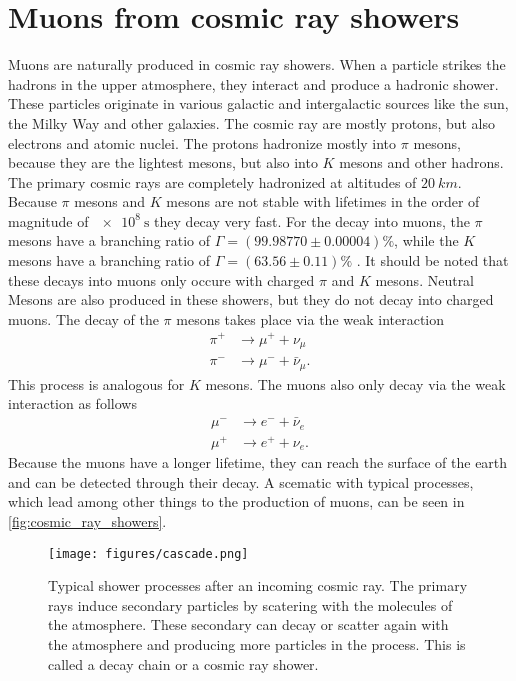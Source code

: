 \section{Muons from cosmic ray showers} 
Muons are naturally produced in cosmic ray showers. When a particle strikes the 
hadrons in the upper atmosphere, they interact and produce a hadronic shower. These particles originate 
in various galactic and intergalactic sources like the sun, the Milky Way and other galaxies. The cosmic 
ray are mostly protons, but also electrons and atomic nuclei. The protons 
hadronize mostly into $\pi$ mesons, because they are the lightest mesons, but also into $K$ mesons 
and other hadrons.
The primary cosmic rays are completely hadronized at altitudes of $\SI{20}{km}$. Because $\pi$ mesons and $K$ mesons are not stable with lifetimes in the order of 
magnitude of $\SI{e8}{\second}$ they decay very fast. For the decay into muons, the $\pi$ mesons have a branching ratio
of $\Gamma = (99.98770\pm{0.00004})\%$, while the $K$ mesons have a branching ratio of $\Gamma = (63.56\pm{0.11})\%$ \cite{pdg}. 
It should be noted that these decays into muons only occure with charged $\pi$ and $K$ mesons. Neutral 
Mesons are also produced in these showers, but they do not decay into charged muons. The decay of the $\pi$ mesons 
takes place via the weak interaction 
\begin{align*}
    \pi^{+} &\to \mu^{+} + \nu_{\mu} \\
    \pi^{-} &\to \mu^{-} + \bar{\nu}_{\mu}.
\end{align*}
This process is analogous for $K$ mesons. The muons also only decay via the weak interaction as follows 
\begin{align*}
    \mu^{-} &\to e^{-} + \bar{\nu}_{e} \\
    \mu^{+} &\to e^{+} + \nu_{e}.
\end{align*}
Because the muons have a longer lifetime, they can reach the surface of the earth and can be detected through their decay. 
A scematic with typical processes, which lead among other things to the production of muons, can be seen in \autoref{fig:cosmic_ray_showers}.
\begin{figure}
    \centering
    \texttt{[image: figures/cascade.png]}
    \caption{Typical shower processes after an incoming cosmic ray. The primary rays induce secondary particles by scatering with the 
    molecules of the atmosphere. These secondary can decay or scatter again with the atmosphere and producing more particles in the process. 
    This is called a decay chain or a cosmic ray shower\cite{nasa}.}
    \label{fig:cosmic_ray_showers}
\end{figure}
